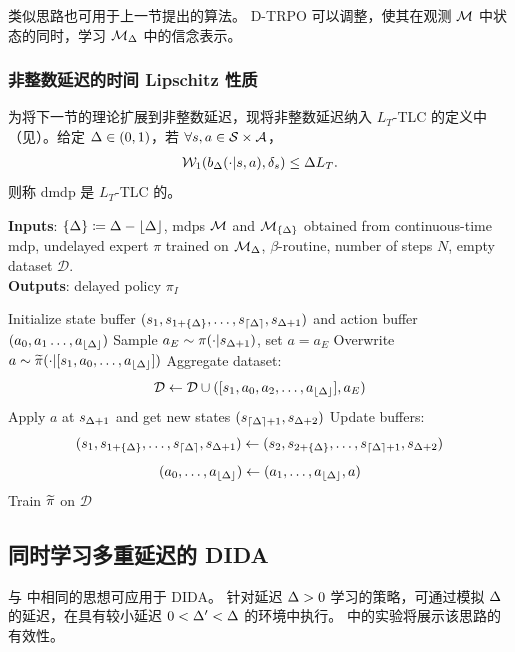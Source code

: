 \begin{remark}
    类似思路也可用于上一节提出的算法。
    D-TRPO 可以调整，使其在观测 $\mathcal{M}$ 中状态的同时，学习 $\mathcal{M}_\Delta$ 中的信念表示。
\end{remark}


\subsubsection{非整数延迟的时间 Lipschitz 性质}
为将下一节的理论扩展到非整数延迟，现将非整数延迟纳入 $L_T$-TLC 的定义中（见）。给定 $\Delta\in(0,1)$，若 $\forall s,a\in \mathcal{S}\times\mathcal{A}$，
\begin{align}
\label{eq:time_lip_non_int}
    \mathcal{W}_{1}(b_\Delta(\cdot\vert s,a), \delta_s)\le \Delta L_T.
\end{align}
则称 \gls{dmdp} 是 $L_T$-TLC 的。




\begin{algorithm}[t]
\caption{面向非整数延迟的 DIDA（$\delay\in\realnumbers[\ge0]$）}\label{algo:dida_non_int}
\textbf{Inputs}:
$\{\Delta\}\coloneqq\Delta-\lfloor\Delta\rfloor$, \glspl{mdp} $\mathcal{M}$ and $\mathcal{M}_{\{\Delta\}}$ obtained from continuous-time \gls{mdp}, undelayed expert $\pi$ trained on $\mathcal{M}_{\Delta}$, $\beta$-routine, number of steps $N$, empty dataset $\mathcal{D}$.\\
\textbf{Outputs}: delayed policy $\pi_I$
\begin{algorithmic}[1]
                \STATE Initialize state buffer $( s_{1},s_{1+\{\Delta\}}, \dots, s_{\lceil\Delta\rceil},s_{\Delta+1})$ and action buffer $( a_{0},a_{1} \dots, a_{\lfloor\Delta\rfloor})$
            \ENDIF
            \STATE Sample $a_E\sim\pi(\cdot\vert {{s}}_{\Delta+1})$, set $a=a_E$
                \STATE Overwrite ${ a \sim{\widetilde{\pi}}(\cdot\vert [{s}_{1},a_{0}, \dots, a_{\lfloor\Delta\rfloor}])}$
            \ENDIF
            \STATE Aggregate dataset:
            $$\mathcal{D}\leftarrow \mathcal{D} \cup ([{s}_{1}, a_{0},a_2, \dots, a_{\lfloor\Delta\rfloor}],a_E)$$
            \STATE Apply $a$ at $s_{\Delta+1}$ and get new states $(s_{\lceil\Delta\rceil+1},s_{\Delta+2})$
            \STATE Update buffers:
            $$(s_{1}, s_{1+\{\Delta\}}, \dots, s_{\lceil\Delta\rceil},s_{\Delta+1}) \leftarrow ( s_{2},s_{2+\{\Delta\}}, \dots, s_{\lceil\Delta\rceil+1},s_{\Delta+2})$$
            $$({a}_0,\dots, a_{\lfloor\Delta\rfloor}) \leftarrow ({a}_1,\dots,a_{\lfloor\Delta\rfloor},a)$$
            \ENDFOR
        \STATE Train ${\widetilde{\pi}}$ on $\mathcal{D}$
    \ENDFOR
\end{algorithmic}
\end{algorithm}



\subsection{同时学习多重延迟的 DIDA}
\label{subsubsec:multi_delay_once_imitation}

与 中相同的思想可应用于 DIDA。
针对延迟 $\Delta>0$ 学习的策略，可通过模拟 $\Delta$ 的延迟，在具有较小延迟 $0<\Delta'<\Delta$ 的环境中执行。
 中的实验将展示该思路的有效性。
